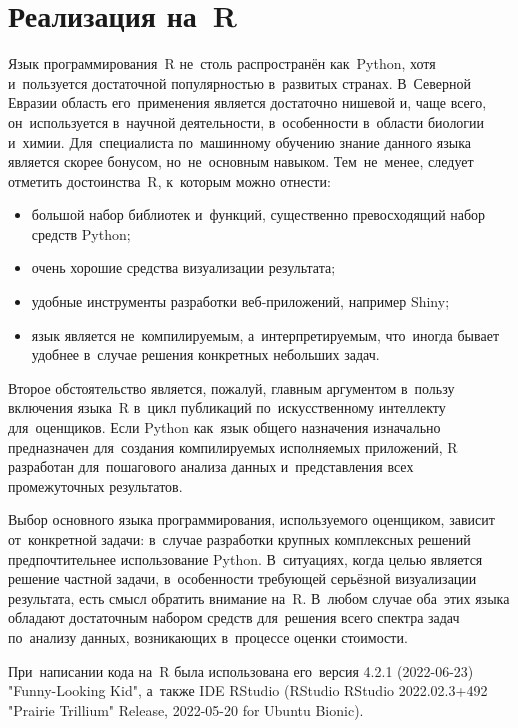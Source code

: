 \documentclass[]{scrreprt}
\begin{document}
\section{Реализация на~R}\label{U-test-R}
%
%
Язык программирования~R не~столь распространён как~Python, хотя и~пользуется достаточной популярностью в~развитых странах. В~Северной Евразии область его~применения является достаточно нишевой и, чаще всего, он~используется в~научной деятельности, в~особенности в~области биологии и~химии. Для~специалиста по~машинному обучению знание данного языка является скорее бонусом, но~не~основным навыком. Тем~не~менее, следует отметить достоинства~R, к~которым можно отнести:
\begin{itemize}
	\item большой набор библиотек и~функций, существенно превосходящий набор средств Python;
	\item очень хорошие средства визуализации результата;
	\item удобные инструменты разработки веб-приложений, например Shiny;
	\item язык является не~компилируемым, а~интерпретируемым, что~иногда бывает удобнее в~случае решения конкретных небольших задач.
\end{itemize}
Второе обстоятельство является, пожалуй, главным аргументом в~пользу включения языка~R в~цикл публикаций по~искусственному интеллекту для~оценщиков. Если Python как~язык общего назначения изначально предназначен для~создания компилируемых исполняемых приложений, R разработан для~пошагового анализа данных и~представления всех промежуточных результатов. 

Выбор основного языка программирования, используемого оценщиком, зависит от~конкретной задачи: в~случае разработки крупных комплексных решений предпочтительнее использование Python. В~ситуациях, когда целью является решение частной задачи, в~особенности требующей серьёзной визуализации результата, есть смысл обратить внимание на~R. В~любом случае оба~этих языка обладают достаточным набором средств для~решения всего спектра задач по~анализу данных, возникающих в~процессе оценки стоимости.

При~написании кода на~R была использована его~версия 4.2.1 (2022-06-23) \foreignlanguage{english}{"Funny-Looking Kid"}, а~также \foreignlanguage{english}{IDE RStudio (RStudio RStudio 2022.02.3+492 "Prairie Trillium" Release, 2022-05-20 for Ubuntu Bionic)}. 
\end{document}

